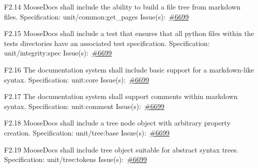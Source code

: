\begin{Requirement}{F2.14}
MooseDocs shall include the ability to build a file tree from markdown files.
\newline
Specification: unit/common:get\_pages
\newline
Issue(s):~\href{https://github.com/idaholab/moose/issues/6699}{\#6699}
\end{Requirement}

\begin{Requirement}{F2.15}
MooseDocs shall include a test that ensures that all python files within the tests directories have an associated test specification.
\newline
Specification: unit/integrity:spec
\newline
Issue(s):~\href{https://github.com/idaholab/moose/issues/6699}{\#6699}
\end{Requirement}

\begin{Requirement}{F2.16}
The documentation system shall include basic support for a markdown-like syntax.
\newline
Specification: unit:core
\newline
Issue(s):~\href{https://github.com/idaholab/moose/issues/6699}{\#6699}
\end{Requirement}

\begin{Requirement}{F2.17}
The documentation system shall support comments within markdown syntax.
\newline
Specification: unit:comment
\newline
Issue(s):~\href{https://github.com/idaholab/moose/issues/6699}{\#6699}
\end{Requirement}

\begin{Requirement}{F2.18}
MooseDocs shall include a tree node object with arbitrary property creation.
\newline
Specification: unit/tree:base
\newline
Issue(s):~\href{https://github.com/idaholab/moose/issues/6699}{\#6699}
\end{Requirement}

\begin{Requirement}{F2.19}
MooseDocs shall include tree object suitable for abstract syntax trees.
\newline
Specification: unit/tree:tokens
\newline
Issue(s):~\href{https://github.com/idaholab/moose/issues/6699}{\#6699}
\end{Requirement}

